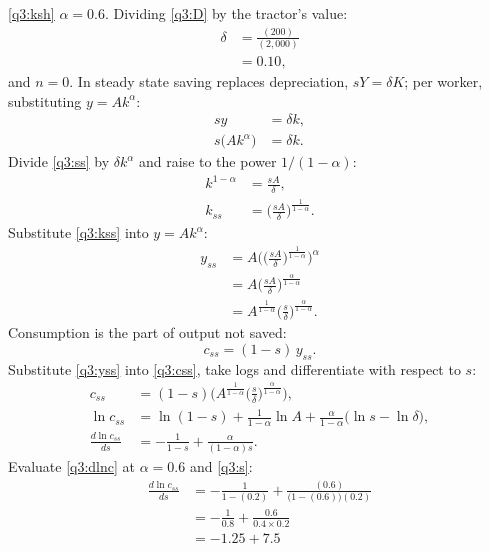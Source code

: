 \begin{sol}
{\eqref{q3:ksh} $\alpha=0.6$. Dividing \eqref{q3:D} by the tractor's value:}
\begin{align}
\delta &= \frac{(200)}{(2{,}000)} \nonumber\\
&= 0.10, \label{q3:delta}
\end{align}
and $n=0$. In steady state saving replaces depreciation, $sY=\delta K$; per worker, substituting $y=Ak^{\alpha}$:
\begin{align}
sy &= \delta k, \nonumber\\
s\big(Ak^{\alpha}\big) &= \delta k. \label{q3:ss}
\end{align}
Divide \eqref{q3:ss} by $\delta k^{\alpha}$ and raise to the power $1/(1-\alpha)$:
\begin{align}
k^{1-\alpha} &= \frac{sA}{\delta}, \nonumber\\
k_{ss} &= \Big(\frac{sA}{\delta}\Big)^{\frac{1}{1-\alpha}}. \label{q3:kss}
\end{align}
Substitute \eqref{q3:kss} into $y=Ak^{\alpha}$:
\begin{align}
y_{ss} &= A\bigg(\Big(\frac{sA}{\delta}\Big)^{\frac{1}{1-\alpha}}\bigg)^{\alpha} \nonumber\\
&= A\Big(\frac{sA}{\delta}\Big)^{\frac{\alpha}{1-\alpha}} \nonumber\\
&= A^{\frac{1}{1-\alpha}}\Big(\frac{s}{\delta}\Big)^{\frac{\alpha}{1-\alpha}}. \label{q3:yss}
\end{align}
Consumption is the part of output not saved:
\begin{equation}
c_{ss}=(1-s)\,y_{ss}. \label{q3:css}
\end{equation}
Substitute \eqref{q3:yss} into \eqref{q3:css}, take logs and differentiate with respect to $s$:
\begin{align}
c_{ss} &= (1-s)\Big(A^{\frac{1}{1-\alpha}}\Big(\frac{s}{\delta}\Big)^{\frac{\alpha}{1-\alpha}}\Big), \nonumber\\
\ln c_{ss} &= \ln(1-s)+\frac{1}{1-\alpha}\ln A+\frac{\alpha}{1-\alpha}\big(\ln s-\ln\delta\big), \nonumber\\
\frac{d\ln c_{ss}}{ds} &= -\frac{1}{1-s}+\frac{\alpha}{(1-\alpha)s}. \label{q3:dlnc}
\end{align}
Evaluate \eqref{q3:dlnc} at $\alpha=0.6$ and \eqref{q3:s}:
\begin{align*}
\frac{d\ln c_{ss}}{ds} &= -\frac{1}{1-(0.2)}+\frac{(0.6)}{\big(1-(0.6)\big)(0.2)}\\
&= -\frac{1}{0.8}+\frac{0.6}{0.4\times0.2}\\
&= -1.25+7.5\\

\end{align*}
\end{sol}
